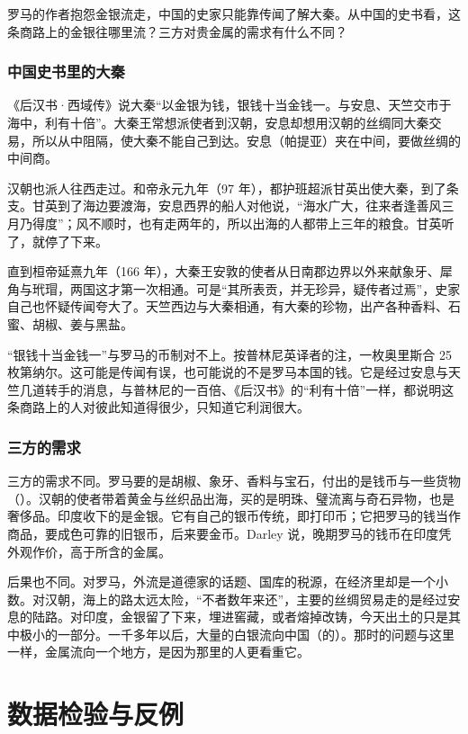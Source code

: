 罗马的作者抱怨金银流走，中国的史家只能靠传闻了解大秦。从中国的史书看，这条商路上的金银往哪里流？三方对贵金属的需求有什么不同？

\subsubsection{中国史书里的大秦}
《后汉书·西域传》说大秦“以金银为钱，银钱十当金钱一。与安息、天竺交市于海中，利有十倍”。大秦王常想派使者到汉朝，安息却想用汉朝的丝绸同大秦交易，所以从中阻隔，使大秦不能自己到达\cite{houhanshu}。安息（帕提亚）夹在中间，要做丝绸的中间商。

汉朝也派人往西走过。和帝永元九年（97 年），都护班超派甘英出使大秦，到了条支。甘英到了海边要渡海，安息西界的船人对他说，“海水广大，往来者逢善风三月乃得度”；风不顺时，也有走两年的，所以出海的人都带上三年的粮食。甘英听了，就停了下来\cite{houhanshu}。

直到桓帝延熹九年（166 年），大秦王安敦的使者从日南郡边界以外来献象牙、犀角与玳瑁，两国这才第一次相通。可是“其所表贡，并无珍异，疑传者过焉”\cite{houhanshu}，史家自己也怀疑传闻夸大了。天竺西边与大秦相通，有大秦的珍物，出产各种香料、石蜜、胡椒、姜与黑盐\cite{houhanshu}。

“银钱十当金钱一”与罗马的币制对不上。按普林尼英译者的注，一枚奥里斯合 25 枚第纳尔\cite{pliny}。这可能是传闻有误，也可能说的不是罗马本国的钱。它是经过安息与天竺几道转手的消息，与普林尼的一百倍、《后汉书》的“利有十倍”一样，都说明这条商路上的人对彼此知道得很少，只知道它利润很大。

\subsubsection{三方的需求}
三方的需求不同。罗马要的是胡椒、象牙、香料与宝石，付出的是钱币与一些货物（）。汉朝的使者带着黄金与丝织品出海，买的是明珠、璧流离与奇石异物\cite{hanshu}，也是奢侈品。印度收下的是金银。它有自己的银币传统，即打印币；它把罗马的钱当作商品，要成色可靠的旧银币，后来要金币。Darley 说，晚期罗马的钱币在印度凭外观作价，高于所含的金属\cite{darley2014}。

后果也不同。对罗马，外流是道德家的话题、国库的税源，在经济里却是一个小数。对汉朝，海上的路太远太险，“不者数年来还”，主要的丝绸贸易走的是经过安息的陆路。对印度，金银留了下来，埋进窖藏，或者熔掉改铸，今天出土的只是其中极小的一部分。一千多年以后，大量的白银流向中国（的）。那时的问题与这里一样，金属流向一个地方，是因为那里的人更看重它。

\section{数据检验与反例}\label{sec:india-test}


